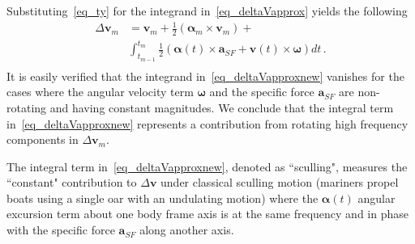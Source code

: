 \documentclass[journal]{IEEEtran}
\begin{document}
Substituting~\eqref{eq_ty} for the integrand in~\eqref{eq_deltaVapprox} yields the following
\begin{equation}\label{eq_deltaVapproxnew}
\begin{split}
\Delta\boldsymbol{v}_m &= \boldsymbol{v}_m+\frac{1}{2}\left(\boldsymbol{\alpha}_m \times \boldsymbol{v}_m \right)+\\
&\int_{t_{m-1}}^{t_m}\frac{1}{2}  \left(\boldsymbol{\alpha}(t)\times \boldsymbol{a}_{SF} +\boldsymbol{v}(t)\times \boldsymbol{\omega}\right)dt\,.\\
\end{split}
\end{equation}
It is easily verified that the integrand in~\eqref{eq_deltaVapproxnew} vanishes for the cases where the angular velocity term $\boldsymbol{\omega}$ and the specific force $\boldsymbol{a}_{SF}$ are  non-rotating and having constant magnitudes. We conclude that the integral term in~\eqref{eq_deltaVapproxnew} represents a contribution from rotating high frequency components in $\Delta\boldsymbol{v}_m $.

The integral term in~\eqref{eq_deltaVapproxnew}, denoted as ``sculling", measures the ``constant" contribution to $\Delta\boldsymbol{v}$ under classical sculling motion (mariners propel boats using a single oar with an undulating motion) where the $\boldsymbol{\alpha}(t)$ angular excursion term about one body frame  axis is at the same frequency and in phase with the specific force $\boldsymbol{a}_{SF}$ along another axis.
\end{document}
